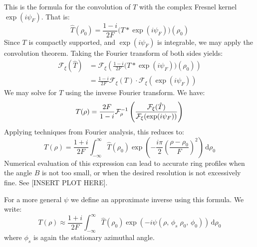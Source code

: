 \documentclass{article}
\theoremstyle{plain}
\begin{document}
        This is the formula for the convolution of $T$ with the complex
        Fresnel kernel $\exp(i\psi_{F})$. That is:
        \begin{equation}
            \hat{T}(\rho_{0})
            =\frac{1-i}{2F}\big(T*\exp(i\psi_{F})\big)(\rho_{0})
        \end{equation}
        Since $T$ is compactly supported, and $\exp(i\psi_{F})$ is integrable,
        we may apply the convolution theorem. Taking the Fourier transform
        of both sides yields:
        \begin{subequations}
            \begin{align}
                \mathcal{F}_{\xi}(\hat{T})
                &=\mathcal{F}_{\xi}\left(
                    \frac{1-i}{2F}\big(T*\exp(i\psi_{F})\big)(\rho_{0})
                \right)\\
                &=\frac{1-i}{2F}\mathcal{F}_{\xi}\left(T\right)\cdot
                    \mathcal{F}_{\xi}\left(\exp(i\psi_{F})\right)
            \end{align}
        \end{subequations}
        We may solve for $T$ using the inverse Fourier transform. We have:
        \begin{equation}
            T(\rho)=\frac{2F}{1-i}\mathcal{F}^{-1}_{\rho}\left(
                \frac{%
                    \mathcal{F}_{\xi}(\hat{T})%
                }{%
                    \mathcal{F}_{\xi}(\exp(i\psi_{F}))
                }
            \right)
        \end{equation}
        Applying techniques from Fourier analysis, this reduces to:
        \begin{equation}
            T(\rho)=\frac{1+i}{2F}\int_{-\infty}^{\infty}
                \hat{T}(\rho_{0})\exp\left(
                    -\frac{i\pi}{2}\left(\frac{\rho-\rho_{0}}{F}\right)^{2}
                \right)\,\textrm{d}\rho_{0}
        \end{equation}
        Numerical evaluation of this expression can lead to accurate
        ring profiles when the angle $B$ is not too small, or when the
        desired resolution is not excessively fine. See
        [INSERT PLOT HERE].
        \par\hfill\par
        For a more general $\psi$ we define an approximate inverse using this
        formula. We write:
        \begin{equation}
            T(\rho)
            \approx\frac{1+i}{2F}\int_{-\infty}^{\infty}
                \hat{T}(\rho_{0})\exp\left(
                    -i\psi(\rho,\,\phi_{s}\;\rho_{0},\,\phi_{0})
                \right)\,\textrm{d}\rho_{0}
        \end{equation}
        where $\phi_{s}$ is again the stationary azimuthal angle.
\end{document}
